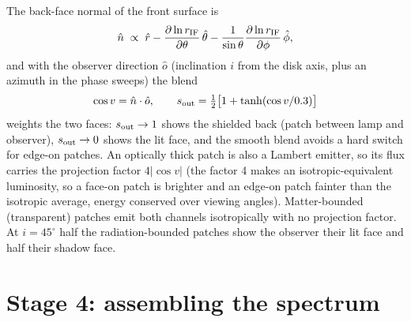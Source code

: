 \documentclass[11pt]{article}
\newcommand{\rIF}{r_{\rm IF}}
\begin{document}
The back-face normal of the front surface is
\begin{equation}
\hat{n} \;\propto\; \hat{r}
 - \frac{\partial \ln \rIF}{\partial\theta}\,\hat{\theta}
 - \frac{1}{\sin\theta}\frac{\partial \ln \rIF}{\partial\phi}\,\hat{\phi},
\end{equation}
and with the observer direction $\hat{o}$ (inclination $i$ from the
disk axis, plus an azimuth in the phase sweeps) the blend
\begin{equation}
\cos v = \hat{n}\cdot\hat{o}, \qquad
s_{\rm out} = \tfrac12\bigl[1 + \tanh(\cos v / 0.3)\bigr]
\end{equation}
weights the two faces: $s_{\rm out}\to1$ shows the shielded back
(patch between lamp and observer), $s_{\rm out}\to0$ shows the lit
face, and the smooth blend avoids a hard switch for edge-on patches.
An optically thick patch is also a Lambert emitter, so its flux
carries the projection factor $4|\cos v|$ (the factor 4 makes an
isotropic-equivalent luminosity, so a face-on patch is brighter and an
edge-on patch fainter than the isotropic average, energy conserved
over viewing angles). Matter-bounded (transparent) patches emit both
channels isotropically with no projection factor. At $i=45^\circ$
half the radiation-bounded patches show the observer their lit face
and half their shadow face.

\section{Stage 4: assembling the spectrum}
\end{document}

